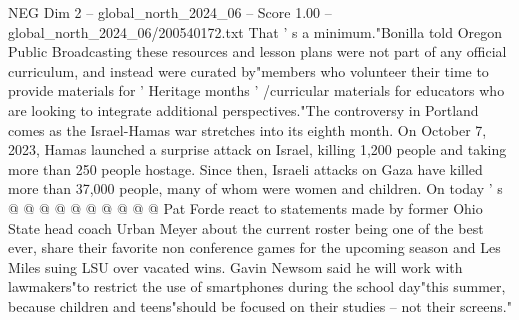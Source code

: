 \begin{textsample}{NEG Dim 2 – global\_north\_2024\_06 – Score 1.00 – global\_north\_2024\_06/200540172.txt}
That ' s a minimum."Bonilla told Oregon Public Broadcasting these resources and lesson plans were not part of any official curriculum, and instead were curated by"members who volunteer their time to provide materials for ' Heritage months ' /curricular materials for educators who are looking to integrate additional perspectives."The controversy in Portland comes as the Israel-Hamas war stretches into its eighth month.
On October 7, 2023, Hamas launched a surprise attack on Israel, killing 1,200 people and taking more than 250 people hostage.
Since then, Israeli attacks on Gaza have killed more than 37,000 people, many of whom were women and children.
On today ' s @ @ @ @ @ @ @ @ @ @ Pat Forde react to statements made by former Ohio State head coach Urban Meyer about the current roster being one of the best ever, share their favorite non conference games for the upcoming season and Les Miles suing LSU over vacated wins.
Gavin Newsom said he will work with lawmakers"to restrict the use of smartphones during the school day"this summer, because children and teens"should be focused on their studies -- not their screens."

\end{textsample}
